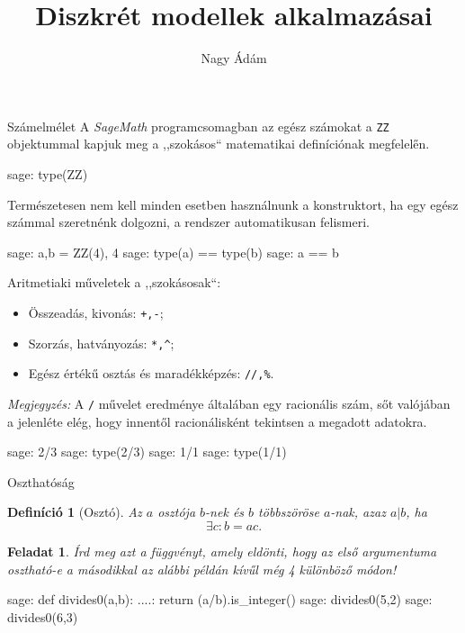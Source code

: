 \documentclass{amsbook}
\title{Diszkrét modellek alkalmazásai}
\author{Nagy Ádám}
\theoremstyle{mystyle}
\newtheorem{exercise}{Feladat}[part]
\newtheorem{definition}{Definíció}[section]
\begin{document}
\maketitle

\begin{part}{Számelmélet}
  A \emph{SageMath} programcsomagban az egész számokat a \texttt{ZZ} objektummal kapjuk
  meg a ,,szokásos``  matematikai definíciónak megfelel\H en.
  \begin{sageexample}
    sage: type(ZZ)
  \end{sageexample}
  
  Természetesen nem kell minden esetben használnunk a konstruktort, ha egy
  egész számmal szeretnénk dolgozni, a rendszer automatikusan felismeri.
  \begin{sageexample}
    sage: a,b = ZZ(4), 4
    sage: type(a) == type(b)
    sage: a == b
  \end{sageexample}

  Aritmetiaki m\H uveletek a ,,szokásosak``:
  \begin{itemize}
    \item Összeadás, kivonás: \texttt{+,-};
    \item Szorzás, hatványozás: \texttt{*,\^};
    \item Egész érték\H u osztás és maradékképzés: \texttt{//,\%}.
  \end{itemize}
  
  \emph{Megjegyzés:} A \texttt{/} m\H uvelet eredménye általában egy racionális
  szám, sőt valójában a jelenléte elég, hogy innentől racionálisként
  tekintsen a megadott adatokra.
  \begin{sageexample}
    sage: 2/3
    sage: type(2/3)
    sage: 1/1
    sage: type(1/1)
  \end{sageexample}

\begin{section}{Oszthatóság}
  \begin{definition}[Osztó]
    Az $a$ osztója $b$-nek és $b$ többszöröse $a$-nak, azaz $a|b$, ha
    \[ \exists c: b = ac.\]
  \end{definition}
    
  \begin{exercise}Írd meg azt a függvényt, amely eldönti, hogy az els\H o
    argumentuma osztható-e a másodikkal az alábbi példán kív\H ul még 4 
    különböz\H o módon!
  \end{exercise}
    
  \begin{sageexample}
    sage: def divides0(a,b):
    ....:     return (a/b).is_integer()
    sage: divides0(5,2)
    sage: divides0(6,3)
  \end{sageexample}


\end{section}
\end{part}
\end{document}
